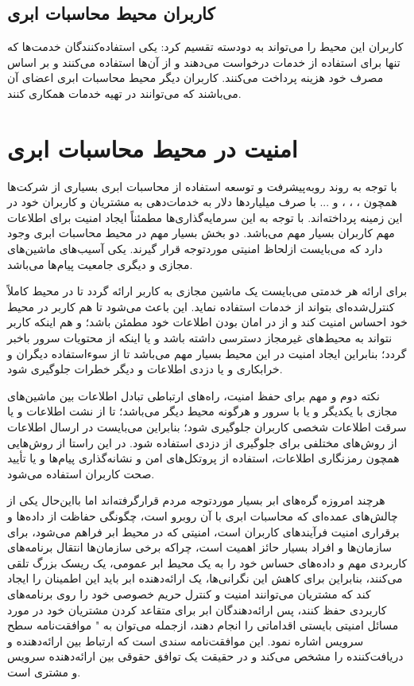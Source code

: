 \documentclass[a4paper,oneside,12pt]{report}
\begin{document}
\subsection{کاربران محیط محاسبات ابری}
 کاربران این محیط را می‌تواند به دودسته تقسیم کرد: یکی استفاده‌کنندگان خدمت‌ها که تنها برای استفاده از خدمات درخواست می‌دهند و از آن‌ها استفاده می‌کنند و بر اساس مصرف خود هزینه پرداخت می‌کنند. کاربران دیگر محیط محاسبات ابری اعضای آن می‌باشند که می‌توانند در تهیه خدمات همکاری کنند.
\section{امنیت در محیط محاسبات ابری}
با توجه به روند روبه‌پیشرفت و توسعه استفاده از محاسبات ابری بسیاری از شرکت‌ها همچون 
، 
، 
، 
 و ... با صرف میلیاردها دلار به خدمات‌دهی به مشتریان و کاربران خود در این زمینه پرداخته‌اند. با توجه به این سرمایه‌گذاری‌ها مطمئناً ایجاد امنیت برای اطلاعات مهم کاربران بسیار مهم می‌باشد. دو بخش بسیار مهم در محیط محاسبات ابری وجود دارد که می‌بایست ازلحاظ امنیتی موردتوجه قرار گیرند. یکی آسیب‌های ماشین‌های مجازی و دیگری جامعیت پیام‌ها می‌باشد.
 
برای ارائه هر خدمتی می‌بایست یک ماشین مجازی به کاربر ارائه گردد تا در محیط کاملاً کنترل‌شده‌ای بتواند از خدمات استفاده نماید. این باعث می‌شود تا هم کاربر در محیط خود احساس امنیت کند و از در امان بودن اطلاعات خود مطمئن باشد؛ و هم اینکه کاربر نتواند به محیط‌های غیرمجاز دسترسی داشته باشد و یا اینکه از محتویات سرور باخبر گردد؛ بنابراین ایجاد امنیت در این محیط بسیار مهم می‌باشد تا از سوءاستفاده دیگران و خرابکاری و یا دزدی اطلاعات و دیگر خطرات جلوگیری شود.

 نکته دوم و مهم برای حفظ امنیت، راه‌های ارتباطی تبادل اطلاعات بین ماشین‌های مجازی با یکدیگر و یا با سرور و هرگونه محیط دیگر می‌باشد؛ تا از نشت اطلاعات و یا سرقت اطلاعات شخصی کاربران جلوگیری شود؛ بنابراین می‌بایست در ارسال اطلاعات از روش‌های مختلفی برای جلوگیری از دزدی استفاده شود. در این راستا از روش‌هایی همچون رمزنگاری اطلاعات، استفاده از پروتکل‌های امن و نشانه‌گذاری پیام‌ها و یا تأیید صحت کاربران استفاده می‌شود.
 
هرچند امروزه گره‌های ابر بسیار موردتوجه مردم قرارگرفته‌اند اما بااین‌حال یکی از چالش‌های عمده‌ای که محاسبات ابری با آن روبرو است، چگونگی حفاظت از داده‌ها و برقراری امنیت فرآیندهای کاربران است، امنیتی که در محیط ابر فراهم می‌شود، برای سازمان‌ها و افراد بسیار حائز اهمیت است، چراکه برخی سازمان‌ها انتقال برنامه‌های کاربردی مهم و داده‌های حساس خود را به یک محیط ابر عمومی، یک ریسک بزرگ تلقی می‌کنند، بنابراین برای کاهش این نگرانی‌ها، یک ارائه‌دهنده ابر باید این اطمینان را ایجاد کند که مشتریان می‌توانند امنیت و کنترل حریم خصوصی خود را روی برنامه‌های کاربردی حفظ کنند، پس ارائه‌دهندگان ابر برای متقاعد کردن مشتریان خود در مورد مسائل امنیتی بایستی اقداماتی را انجام دهند، ازجمله می‌توان به " موافقت‌نامه سطح سرویس اشاره نمود. این موافقت‌نامه سندی است که ارتباط بین ارائه‌دهنده و دریافت‌کننده را مشخص می‌کند و در حقیقت یک توافق حقوقی بین ارائه‌دهنده سرویس و مشتری است.
\end{document}
